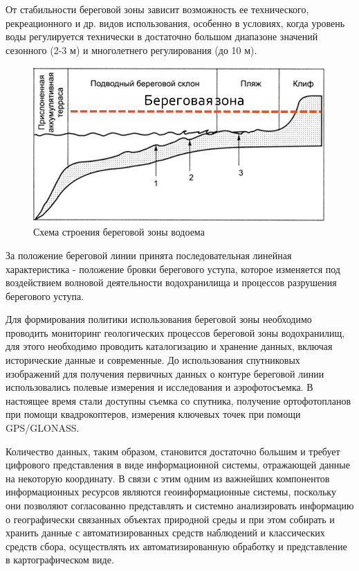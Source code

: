 \documentclass[732,14pt,final]{studrep}
\begin{document}
От стабильности береговой зоны зависит возможность ее технического, рекреационного и др. видов использования, особенно в условиях, когда уровень воды регулируется технически в достаточно большом диапазоне значений сезонного (2-3 м) и многолетнего регулирования (до 10 м).

\begin{center}
  \begin{figure}[htp]
	\centering
    \includegraphics[width=\linewidth]{pics/image1.png}
    \caption{Схема строения береговой зоны водоема}
    \label{fig:shore-schema}
  \end{figure}
\end{center}

За положение береговой линии принята последовательная линейная характеристика - положение бровки берегового уступа, которое изменяется под воздействием волновой деятельности водохранилища и процессов разрушения берегового уступа.

Для формирования политики использования береговой зоны необходимо проводить мониторинг геологических процессов береговой зоны водохранилищ, для этого необходимо проводить каталогизацию и хранение данных, включая исторические данные и современные. До использования спутниковых изображений для получения первичных данных о контуре береговой линии использовались полевые измерения и исследования и аэрофотосъемка. В настоящее время стали доступны съемка со спутника, получение ортофотопланов при помощи квадрокоптеров, измерения ключевых точек при помощи GPS/GLONASS.

Количество данных, таким образом, становится достаточно большим и требует цифрового представления в виде информационной системы, отражающей данные на некоторую координату. В связи с этим одним из важнейших компонентов информационных ресурсов являются геоинформационные системы, поскольку они позволяют согласованно представлять и системно анализировать информацию о географически связанных объектах природной среды и при этом собирать и хранить данные с автоматизированных средств наблюдений и классических средств сбора, осуществлять их автоматизированную обработку и представление в картографическом виде.
\end{document}
